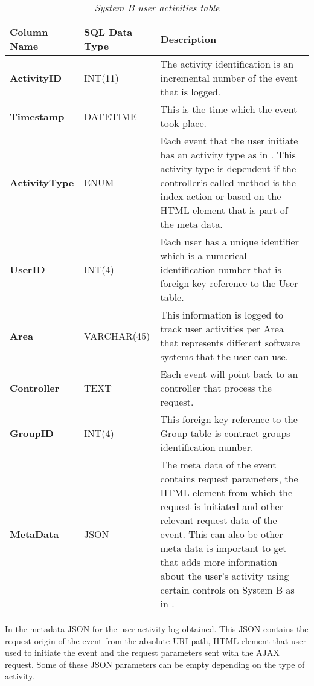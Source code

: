 \begin{table}[!htb]
	\centering
	\small
	\caption[System B user activities table]
	{\textit{System B user activities table}}
	\label{tbl:CH2_SystemB_LoggingTable}
	\begin{tabularx}{\textwidth}{|l|l|X|}
		\hline \textbf{Column Name} & \textbf{SQL Data Type} & \textbf{Description} \\
		\hline \textbf{ActivityID} & INT(11) & The activity identification is an incremental number of the event that is logged.\\
		\hline \textbf{Timestamp} & DATETIME & This is the time which the event took place.\\
		\hline \textbf{ActivityType} & ENUM & Each event that the user initiate has an activity type as in \Cref{tbl:Ch2_SystemB_ActivityTypes}. This activity type is dependent if the controller's called method is the index action or based on the HTML element that is part of the meta data. \\
		\hline \textbf{UserID} & INT(4) & Each user has a unique identifier which is a numerical identification number that is foreign key reference to the User table. \\
		\hline \textbf{Area} & VARCHAR(45) & This information is logged to track user activities per Area that represents different software systems that the user can use. \\
		\hline \textbf{Controller} & TEXT & Each event will point back to an controller that process the request. \\
		\hline \textbf{GroupID} & INT(4) & This foreign key reference to the Group table is contract groups identification number. \\
		\hline \textbf{MetaData} & JSON & The meta data of the event contains request parameters, the HTML element from which the request is initiated and other relevant request data of the event. This can also be other meta data is important to get that adds more information about the user's activity using certain controls on System B as in \Cref{fig:CH2_SystemBMetaData}. \\
		\hline
	\end{tabularx}
\end{table}

In  the metadata JSON for the user activity log obtained. This JSON contains the request origin of the event from the absolute URI path, HTML element that user used to initiate the event and the request parameters sent with the AJAX request. Some of these JSON parameters can be empty depending on the type of activity.

